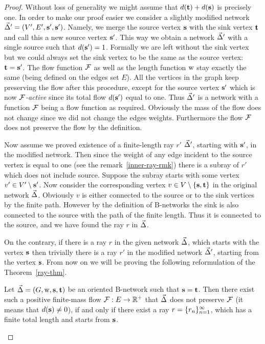 \documentclass[12pt]{article}
\begin{document}
    \begin{proof}
      Without loss of generality we might assume that $d(\mathbf{t}) + d(\mathbf{s})$ is precisely one.
      In order to make our proof easier we consider a slightly modified network $\vec{\Delta}' = (V', E', \mathbf{s}', \mathbf{s}')$.
      Namely, we merge the source vertex $\mathbf{s}$ with the sink vertex $\mathbf{t}$ and call this a
        new source vertex $\mathbf{s}'$.
      This way we obtain a network $\vec{\Delta}'$ with a single source such that $d(\mathbf{s}') = 1$.
      Formally we are left without the sink vertex but we could always set the sink vertex to be the same as the source vertex: $\mathbf{t}=\mathbf{s}'$.
      The flow function $\mathcal{F}$ as well as the length function $\mathrm{w}$ stay exactly the same (being defined on the edges set $E$).
      All the vertices in the graph keep preserving the flow after this procedure, except for the source vertex $\mathbf{s}'$
        which is now \emph{$\mathcal{F}$-active} since its total flow $d(\mathbf{s}')$ equal to one.
      Thus $\vec{\Delta}'$ is a network with a function $\mathcal{F}$ being a flow function as required.
      Obviously the mass of the flow does not change since we did not change the edges weights.
      Furthermore the flow $\mathcal{F}$ does not preserve the flow by the definition.

      Now assume we proved existence of a finite-length ray $r'$ $\vec{\Delta}'$, starting with $\mathbf{s}'$, in the modified network.
      Then since the weight of any edge incident to the source vertex is equal to one (see the remark~\ref{inner-ray-rmk})
        there is a subray of $r'$ which does not include source.
      Suppose the subray starts with some vertex $v' \in V' \setminus \mathbf{s}'$.
      Now consider the corresponding vertex $v \in V \setminus \left\{\mathbf{s}, \mathbf{t}\right\}$ in the original network $\vec{\Delta}$.
      Obviously $v$ is either connected to the source or to the sink vertices by the finite path.
      However by the definition of B-networks the sink is also connected to the source with the path of the finite length.
      Thus it is connected to the source, and we have found the ray $r$ in $\vec{\Delta}$.

      On the contrary, if there is a ray $r$ in the given network $\vec{\Delta}$, which starts with the vertex $\mathbf{s}$
        then trivially there is a ray $r'$ in the modified network $\vec{\Delta}'$, starting from the vertex $\mathbf{s}$.
      From now on we will be proving the following reformulation of the Theorem~\ref{ray-thm}.
      \begin{theorem*}
        Let $\vec{\Delta} = (G, \mathrm{w}, \mathbf{s}, \mathbf{t})$ be an oriented B-network such that $\mathbf{s} = \mathbf{t}$.
        Then there exist such a positive finite-mass flow $\mathcal{F}: E \to \mathbb{R}^{+}$ that
          $\vec{\Delta}$ does not preserve $\mathcal{F}$ (it means that $d(\mathbf{s}) \neq 0$),
          if and only if there exist a ray $r = \{{r}_n\}_{n=1}^\infty$, which has a finite total length and starts from $\mathbf{s}$.
      \end{theorem*}

\end{proof}
\end{document}
